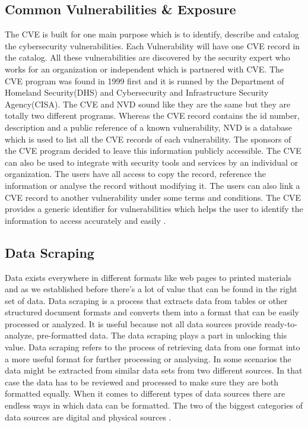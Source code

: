 \subsection{Common Vulnerabilities \& Exposure}
The \acs{CVE} is built for one main purpose which is to identify, describe and catalog the cybersecurity vulnerabilities. Each Vulnerability will have one \acs{CVE} record in the catalog. All these vulnerabilities are discovered by the security expert  who works for an organization or independent which is partnered with \acs{CVE}. The \acs{CVE} program was found in 1999 first and it is runned by the Department of Homeland Security(DHS) and Cybersecurity and Infrastructure Security Agency(CISA). The \acs{CVE} and \acs{NVD} sound like they are the same but they are totally two different programs. Whereas the \acs{CVE} record contains the id number, description and a public reference of a known vulnerability, \acs{NVD} is a database which is used to list all the \acs{CVE} records of each vulnerability. The sponsors of the \acs{CVE} program decided to leave this information publicly accessible. The \acs{CVE} can also be used to integrate with security tools and services by an individual or organization. The users have all access to copy the record, reference the information or analyse the record without modifying it. The users can also link a \acs{CVE} record to another vulnerability under some terms and conditions. The \acs{CVE} provides a generic identifier for vulnerabilities  which helps the user to identify the information to access accurately and easily \cite{cve}. 
%

\subsection{Data Scraping}
Data exists everywhere in different formats like web pages to printed materials and as we established before there’s a lot of value that can be found in the right set of data. Data scraping is a process that extracts data from tables or other structured document formats and converts them into a format that can be easily processed or analyzed. It is useful because not all data sources provide ready-to-analyze, pre-formatted data. The data scraping plays a part in unlocking this value. Data scraping refers to the process of retrieving data from one format into a more useful format for further processing or analysing. In some scenarios the data might be extracted from similar data sets from two different sources. In that case the data has to be reviewed and processed to make sure they are both formatted equally. When it comes to different types of data sources there are endless ways in which data can be formatted. The two of the biggest categories of data sources are digital and physical sources \cite{NaJaMa2018}.
